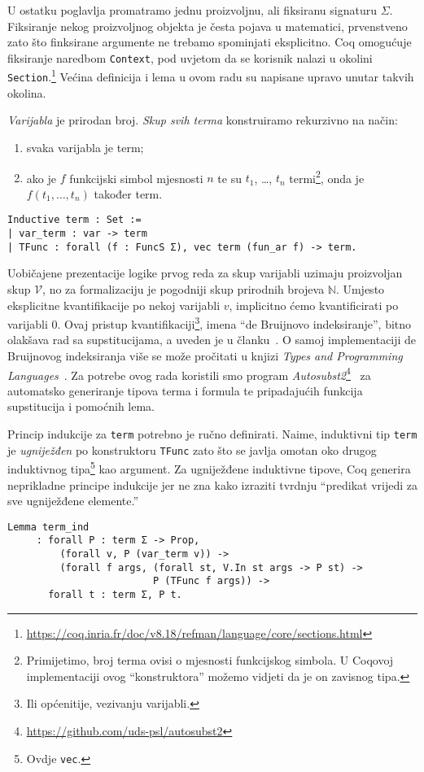 \noindent U ostatku poglavlja promatramo jednu proizvoljnu, ali fiksiranu signaturu \(\Sigma\).
Fiksiranje nekog proizvoljnog objekta je česta pojava u matematici,
prvenstveno zato što finksirane argumente ne trebamo spominjati eksplicitno.
Coq omogućuje fiksiranje naredbom \texttt{Context},
pod uvjetom da se korisnik nalazi u okolini \texttt{Section}.\footnote{\url{https://coq.inria.fr/doc/v8.18/refman/language/core/sections.html}}
Većina definicija i lema u ovom radu su napisane upravo unutar takvih okolina.


\pagebreak
\begin{definition}\label{def:term}
  \textit{Varijabla} je prirodan broj. \textit{Skup svih terma} konstruiramo rekurzivno na način:
  \begin{enumerate}
  \item svaka varijabla je term;
  \item ako je \(f\) funkcijski simbol mjesnosti \(n\) te su \(t_{1}\), \ldots, \(t_{n}\) termi\footnote{Primijetimo, broj terma ovisi o mjesnosti funkcijskog simbola. U Coqovoj implementaciji ovog \enquote{konstruktora} možemo vidjeti da je on zavisnog tipa.},
    onda je \(f(t_{1}, \ldots, t_{n})\) također term.
  \end{enumerate}
\begin{verbatim}
Inductive term : Set :=
| var_term : var -> term 
| TFunc : forall (f : FuncS Σ), vec term (fun_ar f) -> term.
\end{verbatim}
\end{definition}
\noindent Uobičajene prezentacije logike prvog reda za
skup varijabli uzimaju proizvoljan skup \(\mathcal{V}\),
no za formalizaciju je pogodniji skup prirodnih brojeva \(\mathbb{N}\).
Umjesto eksplicitne kvantifikacije po nekoj varijabli \(v\),
implicitno ćemo kvantificirati po varijabli \(0\).
Ovaj pristup kvantifikaciji\footnote{Ili općenitije, vezivanju varijabli.}, imena \enquote{de Bruijnovo indeksiranje},
bitno olakšava rad sa supstitucijama, a uveden je u članku~\cite{debruijnamelessdummies}.
O samoj implementaciji de Bruijnovog indeksiranja više se može pročitati u knjizi
\textit{Types and Programming Languages}~\cite{pierce2002tapl}.
Za potrebe ovog rada koristili smo program \textit{Autosubst2}\footnote{\url{https://github.com/uds-psl/autosubst2}}~\cite{stark-phd,autosubst2}
za automatsko generiranje tipova terma i formula te pripadajućih funkcija supstitucija i pomoćnih lema.

Princip indukcije za \texttt{term} potrebno je ručno definirati.
Naime, induktivni tip \texttt{term} je \textit{ugniježđen} po konstruktoru \texttt{TFunc} zato što
se javlja omotan oko drugog induktivnog tipa\footnote{Ovdje \texttt{vec}.} kao argument.
Za ugniježđene induktivne tipove, Coq generira neprikladne principe indukcije jer ne zna
kako izraziti tvrdnju \enquote{predikat vrijedi za sve ugniježđene elemente.}
\begin{verbatim}
Lemma term_ind
     : forall P : term Σ -> Prop,
         (forall v, P (var_term v)) ->
         (forall f args, (forall st, V.In st args -> P st) ->
                         P (TFunc f args)) ->
       forall t : term Σ, P t.
\end{verbatim}

